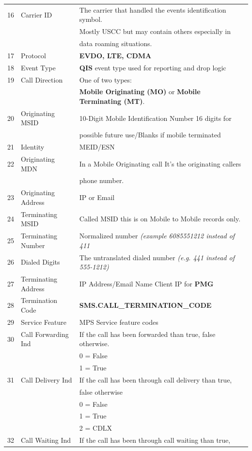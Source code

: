 \documentclass[12pt,twoside]{article}
\begin{document}
\begin{longtable}{c|l|l}
16 & Carrier ID & The carrier that handled the events identification symbol.\\
&  & Mostly USCC but may contain others especially in\\
&  & data roaming situations.\\
17 & Protocol & \textbf{EVDO, LTE, CDMA}\\
18 & Event Type & \textbf{QIS} event type used for reporting and drop logic\\
19 & Call Direction & One of two types:\\
&  & \textbf{Mobile Originating (MO)} or \textbf{Mobile Terminating (MT)}.\\
20 & Originating MSID & 10-Digit Mobile Identification Number 16 digits for\\
&  & possible future use/Blanks if mobile terminated\\
21 & Identity & MEID/ESN\\
22 & Originating MDN & In a Mobile Originating call It's the originating callers\\
&  & phone number.\\
23 & Originating Address & IP or Email\\
24 & Terminating MSID & Called MSID this is on Mobile to Mobile records only.\\
25 & Terminating Number & Normalized number \emph{(example 6085551212 instead of 411}\\
26 & Dialed Digits & The untranslated dialed number \emph{(e.g. 441 instead of 555-1212)}\\
27 & Terminating Address & IP Address/Email Name Client IP for \textbf{PMG}\\
28 & Termination Code & \textbf{SMS.CALL\_TERMINATION\_CODE}\\
29 & Service Feature & MPS Service feature codes\\
30 & Call Forwarding Ind & If the call has been forwarded than true, false otherwise.\\
&  & 0 = False\\
&  & 1 = True\\
31 & Call Delivery Ind & If the call has been through call delivery than true,\\
&  & false otherwise\\
&  & 0 = False\\
&  & 1 = True\\
&  & 2 = CDLX\\
32 & Call Waiting Ind & If the call has been through call waiting than true,\\

\end{longtable}
\end{document}
